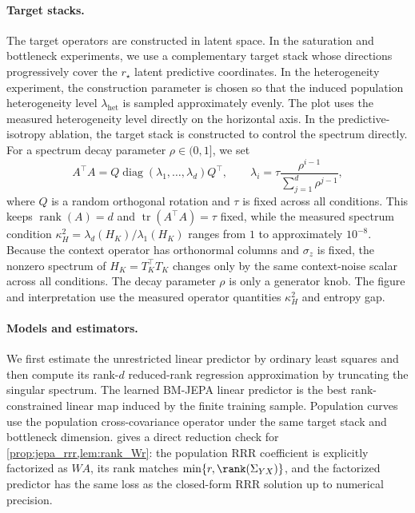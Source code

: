 \paragraph{Target stacks.}
The target operators are constructed in latent space. In the saturation and
bottleneck experiments, we use a complementary target stack whose directions
progressively cover the $r_\star$ latent predictive coordinates. In the
heterogeneity experiment, the construction parameter is chosen so that the
induced population heterogeneity level $\lambda_{\mathrm{het}}$ is sampled
approximately evenly. The plot uses the measured heterogeneity level directly
on the horizontal axis.
In the predictive-isotropy ablation, the target stack is constructed to control
the spectrum directly. For a spectrum decay parameter $\rho\in(0,1]$, we set
\[
    A^\top A
    =
    Q\operatorname{diag}(\lambda_1,\ldots,\lambda_d)Q^\top,
    \qquad
    \lambda_i
    =
    \tau\frac{\rho^{i-1}}{\sum_{j=1}^d\rho^{j-1}},
\]
where $Q$ is a random orthogonal rotation and $\tau$ is fixed across all
conditions. This keeps $\operatorname{rank}(A)=d$ and
$\operatorname{tr}(A^\top A)=\tau$ fixed, while the measured spectrum condition
$\kappa_H^2=\lambda_d(H_K)/\lambda_1(H_K)$ ranges from $1$ to approximately
$10^{-8}$. Because the context operator has orthonormal columns and $\sigma_z$
is fixed, the nonzero spectrum of $H_K=T_K^\top T_K$ changes only by the same
context-noise scalar across all conditions. The decay parameter $\rho$ is only
a generator knob. The figure and interpretation use the measured operator
quantities $\kappa_H^2$ and entropy gap.


\paragraph{Models and estimators.}
We first estimate the unrestricted linear predictor by ordinary least squares
and then compute its rank-$d$ reduced-rank regression approximation by
truncating the singular spectrum. The learned BM-JEPA linear predictor is
the best rank-constrained linear map induced by the finite training sample.
Population curves use the population cross-covariance operator under the same
target stack and bottleneck dimension.
{\color{blue} gives a direct reduction check for
\cref{prop:jepa_rrr,lem:rank_Wr}: the population RRR coefficient is explicitly
factorized as $WA$, its rank matches
$\min\{r,\rank(\Sigma_{YX})\}$, and the factorized predictor has the same loss
as the closed-form RRR solution up to numerical precision.}

